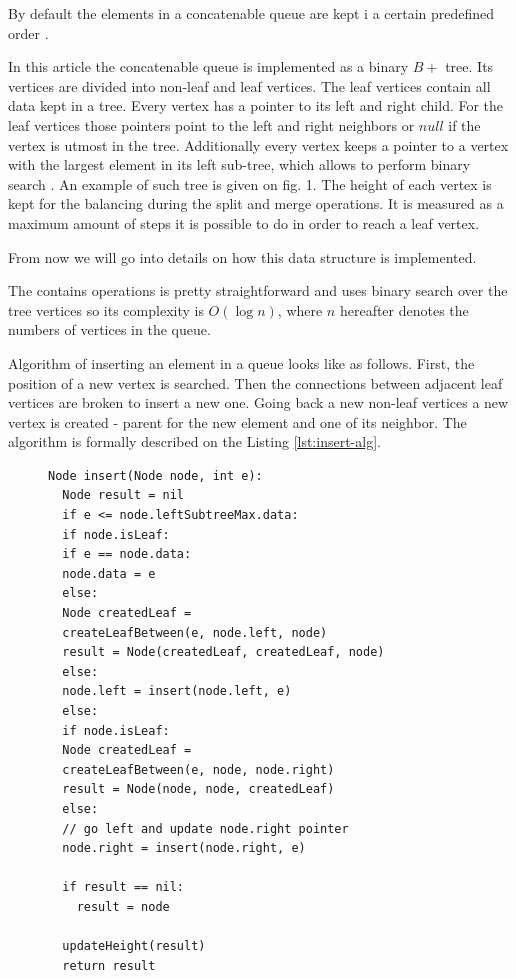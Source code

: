 \documentclass[conference]{IEEEtran}
\theoremstyle{plane}
\begin{document}
		By default the elements in a concatenable queue are kept i a certain predefined order \cite{aho}.
		
		In this article the concatenable queue is implemented as a binary  $B+$ tree. Its vertices are divided into non-leaf and leaf vertices. The leaf vertices contain all data kept in a tree. Every vertex has a pointer to its left and right child. For the leaf vertices those pointers point to the left and right neighbors or $null$ if the vertex is utmost in the tree. 
		Additionally every vertex keeps a pointer to a vertex with the largest element in its left sub-tree, which  allows to perform binary search \cite{aho}.  An example of such tree is given on fig. 1. The height of each vertex is kept for the balancing during the split and merge operations. It is measured as a maximum amount of steps it is possible to do in order to reach a leaf vertex.
		
		From now we will go into details on how this data structure is implemented. 
		
		The contains operations is pretty straightforward and uses binary search over the tree vertices so its complexity is $O(\log n)$, where $n$ hereafter denotes the numbers of vertices in the queue.
		
		Algorithm of inserting an element in a queue looks like as follows. First, the position of a new vertex is searched. Then the connections between adjacent leaf vertices are broken to insert a new one. Going back a new non-leaf vertices a new vertex is created - parent for the new element and one of its neighbor. The algorithm is formally described on the Listing \ref{lst:insert-alg}.
		
		\begin{figure}[htbp]
			\begin{lstlisting}[caption={Queue element insertion algorithm},label={lst:insert-alg},captionpos=b]
Node insert(Node node, int e):
  Node result = nil
  if e <= node.leftSubtreeMax.data: 
  if node.isLeaf:
  if e == node.data:
  node.data = e
  else:
  Node createdLeaf = 
  createLeafBetween(e, node.left, node)
  result = Node(createdLeaf, createdLeaf, node)
  else:
  node.left = insert(node.left, e)
  else:
  if node.isLeaf: 
  Node createdLeaf = 
  createLeafBetween(e, node, node.right)
  result = Node(node, node, createdLeaf)
  else: 
  // go left and update node.right pointer
  node.right = insert(node.right, e)
  
  if result == nil:
  	result = node
  	
  updateHeight(result)
  return result
			\end{lstlisting}
		\end{figure}
		
\end{document}
